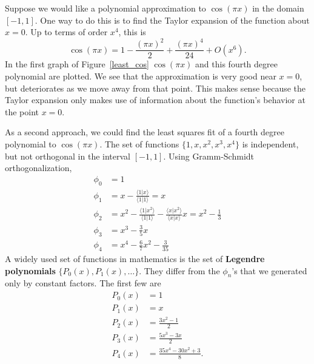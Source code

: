 \begin{Example}
  Suppose we would like a polynomial approximation to $\cos(\pi x)$ in the
  domain $[-1,1]$.  One way to do this is to find the Taylor expansion of 
  the function about $x=0$.  Up to terms of order $x^4$, this is
  \[ 
  \cos(\pi x) = 1 - \frac{(\pi x)^2}{2} + \frac{(\pi x)^4}{24} + O(x^6).
  \]
  In the first graph of Figure~\ref{least_cos} $\cos(\pi x)$ and this fourth 
  degree polynomial are plotted.
  We see that the approximation is very good near $x=0$, but deteriorates
  as we move away from that point.  This makes sense because the Taylor
  expansion only makes use of information about the function's behavior
  at the point $x=0$.

  As a second approach, we could find the least squares fit of a fourth
  degree polynomial to $\cos(\pi x)$.  The set of functions
  $\{1, x, x^2, x^3, x^4\}$ is independent, but not orthogonal in the interval
  $[-1,1]$.  Using Gramm-Schmidt orthogonalization,
  \begin{align*}
    \phi_0 &= 1 \\
    \phi_1 &= x - \frac{\langle 1 | x \rangle}{\langle 1 | 1 \rangle} = x \\
    \phi_2 &= x^2 - \frac{\langle 1 | x^2 \rangle}{\langle 1 | 1 \rangle}
    - \frac{\langle x | x^2 \rangle}{\langle x | x \rangle}x = x^2 - \frac{1}{3} \\
    \phi_3 &= x^3 - \frac{3}{5} x \\
    \phi_4 &= x^4 - \frac{6}{7}x^2 - \frac{3}{35}
  \end{align*}
  A widely used set of functions in mathematics is the set of 
  \textbf{Legendre polynomials} $\{P_0(x), P_1(x), \ldots\}$.
  They differ from the $\phi_n$'s that we generated only by constant factors.
  The first few are
  \begin{align*}
    P_0(x) &= 1 \\
    P_1(x) &= x \\
    P_2(x) &= \frac{3x^2 - 1}{2} \\
    P_3(x) &= \frac{5x^3 - 3x}{2} \\
    P_4(x) &= \frac{35x^4 - 30x^2 + 3}{8}.
  \end{align*}


\end{Example}
